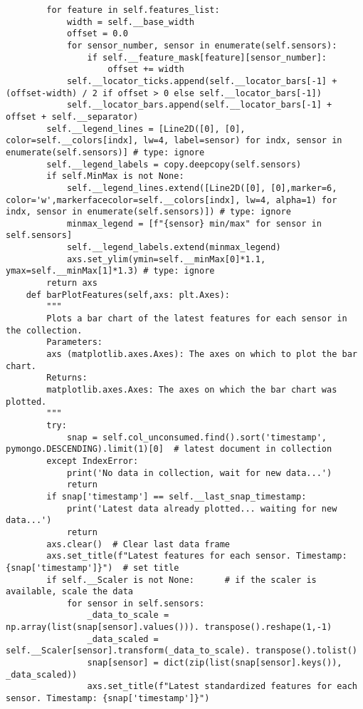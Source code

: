 \begin{verbatim}
        for feature in self.features_list:
            width = self.__base_width
            offset = 0.0          
            for sensor_number, sensor in enumerate(self.sensors):
                if self.__feature_mask[feature][sensor_number]:                        
                    offset += width
            self.__locator_ticks.append(self.__locator_bars[-1] + (offset-width) / 2 if offset > 0 else self.__locator_bars[-1])
            self.__locator_bars.append(self.__locator_bars[-1] + offset + self.__separator)
        self.__legend_lines = [Line2D([0], [0], color=self.__colors[indx], lw=4, label=sensor) for indx, sensor in enumerate(self.sensors)] # type: ignore
        self.__legend_labels = copy.deepcopy(self.sensors)
        if self.MinMax is not None:
            self.__legend_lines.extend([Line2D([0], [0],marker=6, color='w',markerfacecolor=self.__colors[indx], lw=4, alpha=1) for indx, sensor in enumerate(self.sensors)]) # type: ignore
            minmax_legend = [f"{sensor} min/max" for sensor in self.sensors]
            self.__legend_labels.extend(minmax_legend)
            axs.set_ylim(ymin=self.__minMax[0]*1.1, ymax=self.__minMax[1]*1.3) # type: ignore
        return axs
    def barPlotFeatures(self,axs: plt.Axes):
        """
        Plots a bar chart of the latest features for each sensor in the collection.
        Parameters:
        axs (matplotlib.axes.Axes): The axes on which to plot the bar chart.
        Returns:
        matplotlib.axes.Axes: The axes on which the bar chart was plotted.
        """
        try:
            snap = self.col_unconsumed.find().sort('timestamp', pymongo.DESCENDING).limit(1)[0]  # latest document in collection
        except IndexError:
            print('No data in collection, wait for new data...')
            return
        if snap['timestamp'] == self.__last_snap_timestamp:
            print('Latest data already plotted... waiting for new data...')
            return
        axs.clear()  # Clear last data frame
        axs.set_title(f"Latest features for each sensor. Timestamp: {snap['timestamp']}")  # set title
        if self.__Scaler is not None:      # if the scaler is available, scale the data
            for sensor in self.sensors:
                _data_to_scale = np.array(list(snap[sensor].values())). transpose().reshape(1,-1)
                _data_scaled = self.__Scaler[sensor].transform(_data_to_scale). transpose().tolist()
                snap[sensor] = dict(zip(list(snap[sensor].keys()), _data_scaled))
                axs.set_title(f"Latest standardized features for each sensor. Timestamp: {snap['timestamp']}")
    

\end{verbatim}
